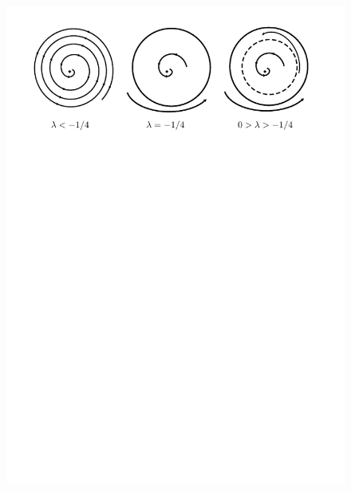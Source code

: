 \begin{example}
\begin{figure}[!ht] \centering
\includegraphics[scale=1.3]{figures/saddlenodecycles.pdf}
\label{fig:bifurcacionsillanododeciclos}
\end{figure}

\end{example}
